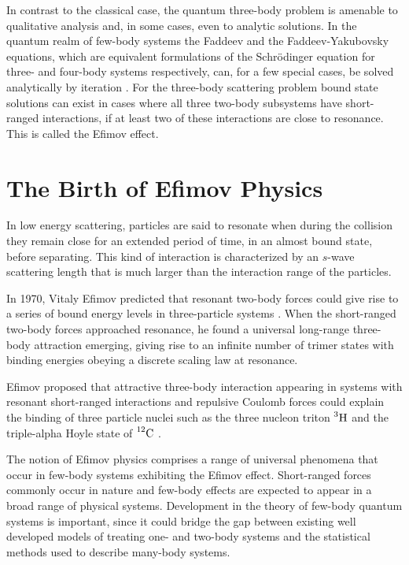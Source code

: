 In contrast to the classical case, the quantum three-body problem is amenable to qualitative analysis \cite{efimov1990qualitative} and, in some cases, even to analytic solutions. In the quantum realm of few-body systems the Faddeev and the Faddeev-Yakubovsky equations, which are equivalent formulations of the Schr{\"o}dinger equation for three- and four-body systems respectively, can, for a few special cases, be solved analytically by iteration \cite{Faddeev:1960su, Zubarev:1994}. For the three-body scattering problem bound state solutions can exist in cases where all three two-body subsystems have short-ranged interactions, if at least two of these interactions are close to resonance. This is called the Efimov effect. 

\section{The Birth of Efimov Physics}
In low energy scattering, particles are said to resonate when during the collision they remain close for an extended period of time, in an almost bound state, before separating. This kind of interaction is characterized by an $s$-wave scattering length that is much larger than the interaction range of the particles. 

In 1970, Vitaly Efimov predicted that resonant two-body forces could give rise to a series of bound energy levels in three-particle systems \cite{Efimov:1970zz}. When the short-ranged two-body forces approached resonance, he found a universal long-range three-body attraction emerging, giving rise to an infinite number of trimer states with binding energies obeying a discrete scaling law at resonance.  

Efimov proposed that attractive three-body interaction appearing in systems with resonant short-ranged interactions and repulsive Coulomb forces could explain the binding of three particle nuclei such as the three nucleon triton $\prescript{3}{}{\mathrm{H}}$ and the triple-alpha Hoyle state of $\prescript{12}{}{\mathrm{C}}$ \cite{Efimov:1970zz,Efimov:1971zz}.

The notion of Efimov physics comprises a range of universal phenomena that occur in few-body systems exhibiting the Efimov effect. Short-ranged forces commonly occur in nature and few-body effects are expected to appear in a broad range of physical systems. Development in the theory of few-body quantum systems is important, since it could bridge the gap between existing well developed models of treating one- and two-body systems and the statistical methods used to describe many-body systems.

